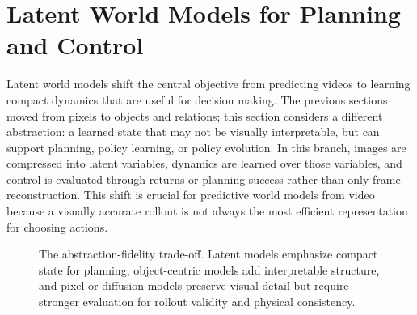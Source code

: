 \section{Latent World Models for Planning and Control}
\label{sec:latent_world_models}

Latent world models shift the central objective from predicting videos to learning compact dynamics that are useful for decision making. The previous sections moved from pixels to objects and relations; this section considers a different abstraction: a learned state that may not be visually interpretable, but can support planning, policy learning, or policy evolution. In this branch, images are compressed into latent variables, dynamics are learned over those variables, and control is evaluated through returns or planning success rather than only frame reconstruction. This shift is crucial for predictive world models from video because a visually accurate rollout is not always the most efficient representation for choosing actions.

\begin{figure}[t]
\centering
{}
\caption{The abstraction-fidelity trade-off. Latent models emphasize compact state for planning, object-centric models add interpretable structure, and pixel or diffusion models preserve visual detail but require stronger evaluation for rollout validity and physical consistency.}
\label{fig:abstraction_fidelity}
\end{figure}

